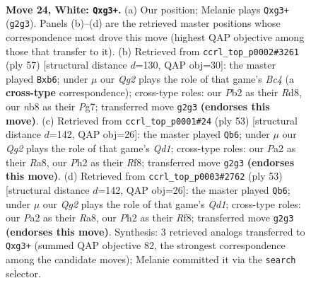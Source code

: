 \documentclass[11pt]{article}
\begin{document}
\clearpage

\begin{figure}[p]\centering
\begin{subfigure}{0.46\textwidth}\centering
\resizebox{\linewidth}{!}{%
\newchessgame
\chessboard[
  setfen={rnb3kr/3n4/2p5/pp1Nq3/8/6p1/PPP1BNQP/1K1R3R w - - 0 24},
  showmover=false,
  pgfstyle=straightmove, color=movearrow, markmove={g2-g3}
]}
\caption{}
\end{subfigure}\hfill
\begin{subfigure}{0.46\textwidth}\centering
\resizebox{\linewidth}{!}{%
\newchessgame
\chessboard[
  setfen={3r1rk1/p5p1/1P1nq2p/2bp4/8/3Q1NP1/3NPP1P/R4RK1 b - - 0 29},
  showmover=false,
  pgfstyle=straightmove, color=movearrow, markmove={c5-b6}
]}
\caption{}
\end{subfigure}
\\[4pt]
\begin{subfigure}{0.46\textwidth}\centering
\resizebox{\linewidth}{!}{%
\newchessgame
\chessboard[
  setfen={r2q1rk1/pp3ppp/3Nbn2/8/6P1/3R1N1P/P2Q1P2/4R1K1 b - - 4 27},
  showmover=false,
  pgfstyle=straightmove, color=movearrow, markmove={d8-b6}
]}
\caption{}
\end{subfigure}\hfill
\begin{subfigure}{0.46\textwidth}\centering
\resizebox{\linewidth}{!}{%
\newchessgame
\chessboard[
  setfen={r2q1rk1/pp3ppp/3Nbn2/8/6P1/3R1N1P/P2Q1P2/4R1K1 b - - 4 27},
  showmover=false,
  pgfstyle=straightmove, color=movearrow, markmove={d8-b6}
]}
\caption{}
\end{subfigure}
\caption{\textbf{Move 24, White: \texttt{Qxg3+}.} (a) Our position; Melanie plays \texttt{Qxg3+} (\texttt{g2g3}). Panels (b)--(d) are the retrieved master positions whose correspondence most drove this move (highest QAP objective among those that transfer to it). (b) Retrieved from \texttt{ccrl\_top\_p0002\#3261} (ply 57) [structural distance $d$=130, QAP obj=30]: the master played \texttt{Bxb6}; under $\mu$ our \emph{Qg2} plays the role of that game's \emph{Bc4} (a \textbf{cross-type} correspondence); cross-type roles: our \emph{P}b2 as their \emph{R}d8, our \emph{n}b8 as their \emph{P}g7; transferred move \texttt{g2g3} \textbf{(endorses this move)}. (c) Retrieved from \texttt{ccrl\_top\_p0001\#24} (ply 53) [structural distance $d$=142, QAP obj=26]: the master played \texttt{Qb6}; under $\mu$ our \emph{Qg2} plays the role of that game's \emph{Qd1}; cross-type roles: our \emph{P}a2 as their \emph{R}a8, our \emph{P}h2 as their \emph{R}f8; transferred move \texttt{g2g3} \textbf{(endorses this move)}. (d) Retrieved from \texttt{ccrl\_top\_p0003\#2762} (ply 53) [structural distance $d$=142, QAP obj=26]: the master played \texttt{Qb6}; under $\mu$ our \emph{Qg2} plays the role of that game's \emph{Qd1}; cross-type roles: our \emph{P}a2 as their \emph{R}a8, our \emph{P}h2 as their \emph{R}f8; transferred move \texttt{g2g3} \textbf{(endorses this move)}. Synthesis: 3 retrieved analogs transferred to \texttt{Qxg3+} (summed QAP objective 82, the strongest correspondence among the candidate moves); Melanie committed it via the \texttt{search} selector.}
\label{fig:thought-m46}
\end{figure}
\end{document}
